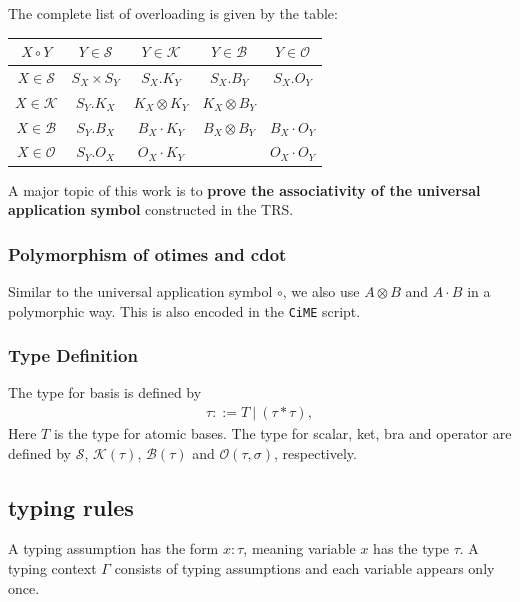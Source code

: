 The complete list of overloading is given by the table:

\begin{center}
  \begin{tabular}{|c|c|c|c|c|}
    \hline
    $X \circ Y$ & $Y \in \mathcal{S}$ & $Y\in \mathcal{K}$ & $Y \in \mathcal{B}$ & $Y \in \mathcal{O}$ \\
    \hline
    $X \in \mathcal{S}$ & $S_X \times S_Y$ & $S_X.K_Y$ & $S_X.B_Y$ & $S_X.O_Y$ \\
    \hline
    $X \in \mathcal{K}$ & $S_Y.K_X$ & $K_X \otimes K_Y$ & $ K_X \otimes B_Y$ &  \\
    \hline
    $X \in \mathcal{B}$ & $S_Y.B_X$ & $B_X \cdot K_Y$ & $B_X \otimes B_Y$ & $B_X \cdot O_Y$ \\
    \hline
    $X \in \mathcal{O}$ & $S_Y.O_X$ & $O_X \cdot K_Y$ &  & $O_X \cdot O_Y$ \\
    \hline
  \end{tabular}
\end{center}


A major topic of this work is to \textbf{prove the associativity of the universal application symbol} constructed in the TRS.

\subsubsection*{Polymorphism of otimes and cdot}
Similar to the universal application symbol $\circ$, we also use $A \otimes B$ and $A \cdot B$ in a polymorphic way. This is also encoded in the \texttt{CiME} script.



\subsubsection*{Type Definition}

\begin{definition}[Types]
  The type for basis is defined by
  \begin{align*}
    \tau ::= T\ |\ (\tau * \tau),
  \end{align*}
  Here $T$ is the type for atomic bases.
  The type for scalar, ket, bra and operator are defined by $\mathcal{S}$, $\mathcal{K}(\tau)$, $\mathcal{B}(\tau)$ and $\mathcal{O}(\tau, \sigma)$, respectively.
\end{definition}

\subsection{typing rules}
  A typing assumption has the form $x : \tau$, meaning variable $x$ has the type $\tau$. A typing context $\Gamma$ consists of typing assumptions and each variable appears only once.


